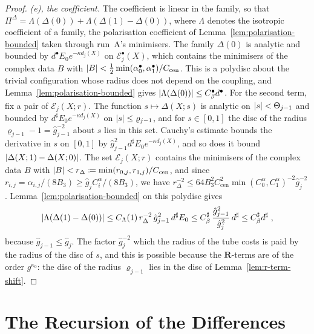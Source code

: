 \documentclass[11pt]{preprint}
\DeclarePairedDelimiter{\abs}{\lvert}{\rvert}
\numberwithin{equation}{section}
\theoremstyle{definition}
\theoremstyle{remark}
\theoremstyle{plain}
\begin{document}
\begin{proof}
\emph{(e), the coefficient.} The coefficient is linear in the family, so that $\Pi^\Delta = \Lambda(\Delta(0)) + \Lambda(\Delta(1) - \Delta(0))$, where $\Lambda$ denotes the isotropic coefficient of a family, the polarisation coefficient of Lemma~\ref{lem:polarisation-bounded} taken through run~A's minimisers. The family $\Delta(0)$ is analytic and bounded by $d^\bullet E_0e^{-\kappa d_j(X)}$ on $\mathcal E^\bullet_j(X)$, which contains the minimisers of the complex data $B$ with $\abs B < \frac12\min(\alpha^\bullet_0, \alpha^\bullet_1)/C_{\mathrm{cen}}$. This is a polydisc about the trivial configuration whose radius does not depend on the coupling, and Lemma~\ref{lem:polarisation-bounded} gives $\abs{\Lambda(\Delta(0))} \leq C^\bullet_\beta d^\bullet$. For the second term, fix a pair of $\mathcal E_j(X; r)$. The function $s \mapsto \Delta(X; s)$ is analytic on $\abs s < \Theta_{j-1}$ and bounded by $d^\sharp E_0e^{-\kappa d_j(X)}$ on $\abs s \leq \varrho_{j-1}$, and for $s \in [0, 1]$ the disc of the radius $\varrho_{j-1} - 1 = \hat g_{j-1}^{-2}$ about $s$ lies in this set. Cauchy's estimate bounds the derivative in $s$ on $[0, 1]$ by $\hat g_{j-1}^2d^\sharp E_0e^{-\kappa d_j(X)}$, and so does it bound $\abs{\Delta(X; 1) - \Delta(X; 0)}$. The set $\mathcal E_j(X; r)$ contains the minimisers of the complex data $B$ with $\abs B < r_\Delta \coloneqq \min(r_{0,j}, r_{1,j})/C_{\mathrm{cen}}$, and since $r_{i,j} = \alpha_{i,j}/(8B_3) \geq \hat g_jC^\alpha_i/(8B_3)$, we have $r_\Delta^{-2} \leq 64B_3^2C_{\mathrm{cen}}^2\min(C^\alpha_0, C^\alpha_1)^{-2}\hat g_j^{-2}$. Lemma~\ref{lem:polarisation-bounded} on this polydisc gives
\[
    \abs{\Lambda(\Delta(1) - \Delta(0))} \leq C_\Lambda(1)\,r_\Delta^{-2}\,\hat g_{j-1}^2\,d^\sharp E_0 \leq C^\sharp_\beta\,\frac{\hat g_{j-1}^2}{\hat g_j^2}\,d^\sharp \leq C^\sharp_\beta d^\sharp\;,
\]
because $\hat g_{j-1} \leq \hat g_j$. The factor $\hat g_j^{-2}$ which the radius of the tube costs is paid by the radius of the disc of $s$, and this is possible because the $\mathbf R$-terms are of the order $g^{\kappa_0}$: the disc of the radius $\varrho_{j-1}$ lies in the disc of Lemma~\ref{lem:r-term-shift}.
\end{proof}

\section{The Recursion of the Differences}\label{sec:recursion-differences}
\end{document}
